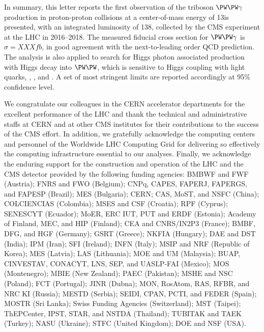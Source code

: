 In summary, this letter reports the first observation of the triboson $\PW\PW\gamma$ production in proton-proton collisions at a center-of-mass energy of 13\TeV is presented, with an integrated luminosity of 138\fbinv, collected by the CMS experiment at the LHC in 2016--2018. The measured fiducial cross section for $\PW\PW\gamma$ is $\sigma=XXX\unit{fb}$, in good agreement with the next-to-leading order QCD prediction. The analysis is also applied to search for Higgs photon associated production with Higgs decay into $\PW\PW$, which is sensitive to Higgs coupling with light quarks, \PQc, \PQs, \PQu and \PQd. A set of most stringent limits are reported accordingly at 95\% confidence level.

\begin{acknowledgments}
We congratulate our colleagues in the CERN accelerator departments for the excellent performance of the LHC and thank the technical and administrative staffs at CERN and at other CMS institutes for their contributions to the success of the CMS effort. In addition, we gratefully acknowledge the computing centers and personnel of the Worldwide LHC Computing Grid for delivering so effectively the computing infrastructure essential to our analyses. Finally, we acknowledge the enduring support for the construction and operation of the LHC and the CMS detector provided by the following funding agencies: BMBWF and FWF (Austria); FNRS and FWO (Belgium); CNPq, CAPES, FAPERJ, FAPERGS, and FAPESP (Brazil); MES (Bulgaria); CERN; CAS, MoST, and NSFC (China); COLCIENCIAS (Colombia); MSES and CSF (Croatia); RPF (Cyprus); SENESCYT (Ecuador); MoER, ERC IUT, PUT and ERDF (Estonia); Academy of Finland, MEC, and HIP (Finland); CEA and CNRS/IN2P3 (France); BMBF, DFG, and HGF (Germany); GSRT (Greece); NKFIA (Hungary); DAE and DST (India); IPM (Iran); SFI (Ireland); INFN (Italy); MSIP and NRF (Republic of Korea); MES (Latvia); LAS (Lithuania); MOE and UM (Malaysia); BUAP, CINVESTAV, CONACYT, LNS, SEP, and UASLP-FAI (Mexico); MOS (Montenegro); MBIE (New Zealand); PAEC (Pakistan); MSHE and NSC (Poland); FCT (Portugal); JINR (Dubna); MON, RosAtom, RAS, RFBR, and NRC KI (Russia); MESTD (Serbia); SEIDI, CPAN, PCTI, and FEDER (Spain); MOSTR (Sri Lanka); Swiss Funding Agencies (Switzerland); MST (Taipei); ThEPCenter, IPST, STAR, and NSTDA (Thailand); TUBITAK and TAEK (Turkey); NASU (Ukraine); STFC (United Kingdom); DOE and NSF (USA). 
\end{acknowledgments}





